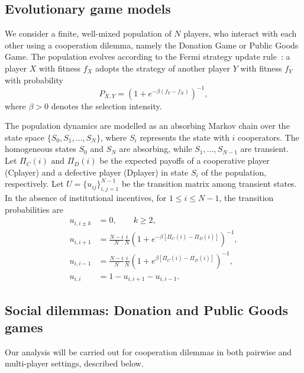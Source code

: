 \documentclass{article}
\begin{document}
\subsection{Evolutionary game models}

We consider a finite, well-mixed population of $N$ players, who interact with each other using a cooperation dilemma, namely the Donation Game or Public Goods Game. The population evolves according to the Fermi strategy update rule~\cite{sigmund2010social}: a player $X$ with fitness $f_X$ adopts the strategy of another player $Y$ with fitness $f_Y$ with probability
\[
P_{X,Y}=\left(1+e^{-\beta(f_Y-f_X)}\right)^{-1},
\]
where $\beta>0$ denotes the selection intensity.

The population dynamics are modelled as an absorbing Markov chain over the state space $\{S_0,S_1,\dots,S_N\}$, where $S_i$ represents the state with $i$ cooperators. The homogeneous states $S_0$ and $S_N$ are absorbing, while $S_1,\dots,S_{N-1}$ are transient. Let $\Pi_C(i) \text{ and } \Pi_D(i)$ be the expected payoffs of a cooperative player (C\text{-}player) and a defective player (D\text{-}player) in state $S_i$ of the population, respectively. Let $U=\{u_{ij}\}_{i,j=1}^{N-1}$ be the transition matrix among transient states. In the absence of institutional incentives, for $1\le i\le N-1$, the transition probabilities are
\begin{equation}
\label{eq: transition probabilities0}
\begin{aligned}
u_{i,i\pm k} &= 0, \qquad k\ge 2, \\
u_{i,i+1} &= \frac{N-i}{N}\frac{i}{N}
\left(1+e^{-\beta[\Pi_C(i)-\Pi_D(i)]}\right)^{-1}, \\
u_{i,i-1} &= \frac{N-i}{N}\frac{i}{N}
\left(1+e^{\beta[\Pi_C(i)-\Pi_D(i)]}\right)^{-1}, \\
u_{i,i} &= 1-u_{i,i+1}-u_{i,i-1}.
\end{aligned}
\end{equation}




\subsection{Social dilemmas: Donation and Public Goods games}
Our analysis will be carried out for cooperation dilemmas in both pairwise and multi-player settings, described below.
\end{document}

